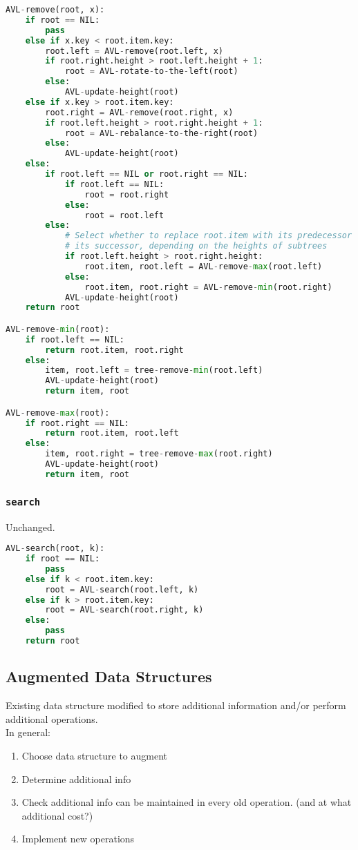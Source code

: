 \begin{lstlisting}[language=Python,mathescape]
AVL-remove(root, x):
	if root == NIL:
		pass
	else if x.key < root.item.key:
		root.left = AVL-remove(root.left, x)
		if root.right.height > root.left.height + 1:
			root = AVL-rotate-to-the-left(root)
		else:
			AVL-update-height(root)
	else if x.key > root.item.key:
		root.right = AVL-remove(root.right, x)
		if root.left.height > root.right.height + 1:
			root = AVL-rebalance-to-the-right(root)
		else:
			AVL-update-height(root)
	else:
		if root.left == NIL or root.right == NIL:
			if root.left == NIL:
				root = root.right
			else:
				root = root.left
		else:
			# Select whether to replace root.item with its predecessor or
			# its successor, depending on the heights of subtrees
			if root.left.height > root.right.height:
				root.item, root.left = AVL-remove-max(root.left)
			else:
				root.item, root.right = AVL-remove-min(root.right)
			AVL-update-height(root)
	return root

AVL-remove-min(root):
	if root.left == NIL:
		return root.item, root.right
	else:
		item, root.left = tree-remove-min(root.left)
		AVL-update-height(root)
		return item, root

AVL-remove-max(root):
	if root.right == NIL:
		return root.item, root.left
	else:
		item, root.right = tree-remove-max(root.right)
		AVL-update-height(root)
		return item, root
\end{lstlisting}

\subsubsection*{\texttt{search}}

\noindent Unchanged.

\begin{lstlisting}[language=Python]
AVL-search(root, k):
	if root == NIL:
		pass
	else if k < root.item.key:
		root = AVL-search(root.left, k)
	else if k > root.item.key:
		root = AVL-search(root.right, k)
	else:
		pass
	return root
\end{lstlisting}


\subsection*{Augmented Data Structures}

\noindent Existing data structure modified to store additional information and/or perform additional operations.\\
In general:
\begin{enumerate}[label={(\arabic*)}]
	\item Choose data structure to augment
	\item Determine additional info
	\item Check additional info can be maintained in every old operation. (and at what additional cost?)
	\item Implement new operations
\end{enumerate}

